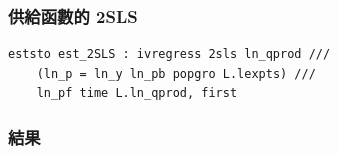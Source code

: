 \begin{frame}[fragile]
    \frametitle{供給函數的 2SLS}
\begin{lstlisting}
eststo est_2SLS : ivregress 2sls ln_qprod ///
    (ln_p = ln_y ln_pb popgro L.lexpts) /// 
    ln_pf time L.ln_qprod, first \end{lstlisting}
\end{frame}

\begin{frame}
    \frametitle{結果}

    \begin{table}
        \scalebox{0.9}{
        
        }
    \end{table}
\end{frame}
